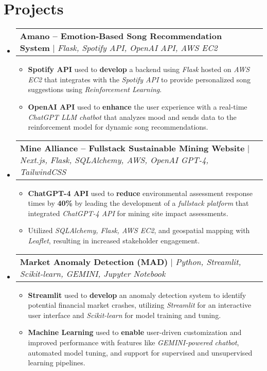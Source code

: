 \documentclass[letterpaper,10pt]{article}
\makeatletter
\newcommand{\resumeItem}[1]{
  \item\small{
    {#1 \vspace{-2pt}}
  }
}
\newcommand{\resumeProjectHeading}[2]{
    \item
    \begin{tabular*}{0.97\textwidth}{l@{\extracolsep{\fill}}r}
      \small#1 & #2 \\
    \end{tabular*}\vspace{-2pt}
}
\newcommand{\resumeSubHeadingListStart}{\begin{itemize}[leftmargin=0.15in, label={}]}
\newcommand{\resumeSubHeadingListEnd}{\end{itemize}}
\newcommand{\resumeItemListStart}{\begin{itemize}}
\newcommand{\resumeItemListEnd}{\end{itemize}\vspace{-5pt}}
\makeatother
\begin{document}
\section{Projects}
    \vspace{-4pt}
    \resumeSubHeadingListStart
      \resumeProjectHeading
          {\textbf{Amano – Emotion-Based Song Recommendation System} $|$ \emph{Flask, Spotify API, OpenAI API, AWS EC2}}{}
      \vspace{-4pt}
          \resumeItemListStart
            \resumeItem{\textbf{Spotify API} used to \textbf{develop} a backend using \emph{Flask} hosted on \emph{AWS EC2} that integrates with the \emph{Spotify API} to provide personalized song suggestions using \emph{Reinforcement Learning}.}
            \resumeItem{\textbf{OpenAI API} used to \textbf{enhance} the user experience with a real-time \emph{ChatGPT LLM chatbot} that analyzes mood and sends data to the reinforcement model for dynamic song recommendations.}
          \resumeItemListEnd

      \resumeProjectHeading
          {\textbf{Mine Alliance – Fullstack Sustainable Mining Website} $|$ \emph{Next.js, Flask, SQLAlchemy, AWS, OpenAI GPT-4, TailwindCSS}}{}
      \vspace{-4pt}
          \resumeItemListStart
            \resumeItem{\textbf{ChatGPT-4 API} used to \textbf{reduce} environmental assessment response times by \textbf{40\%} by leading the development of a \emph{fullstack platform} that integrated \emph{ChatGPT-4 API} for mining site impact assessments.}
            \resumeItem{Utilized \emph{SQLAlchemy, Flask, AWS EC2}, and geospatial mapping with \emph{Leaflet}, resulting in increased stakeholder engagement.}
          \resumeItemListEnd

      \resumeProjectHeading
          {\textbf{Market Anomaly Detection (MAD)} $|$ \emph{Python, Streamlit, Scikit-learn, GEMINI, Jupyter Notebook}}{}
      \vspace{-4pt}
          \resumeItemListStart
            \resumeItem{\textbf{Streamlit} used to \textbf{develop} an anomaly detection system to identify potential financial market crashes, utilizing \emph{Streamlit} for an interactive user interface and \emph{Scikit-learn} for model training and tuning.}
            \resumeItem{\textbf{Machine Learning} used to \textbf{enable} user-driven customization and improved performance with features like \emph{GEMINI-powered chatbot}, automated model tuning, and support for supervised and unsupervised learning pipelines.}
          \resumeItemListEnd
    \resumeSubHeadingListEnd
\end{document}
